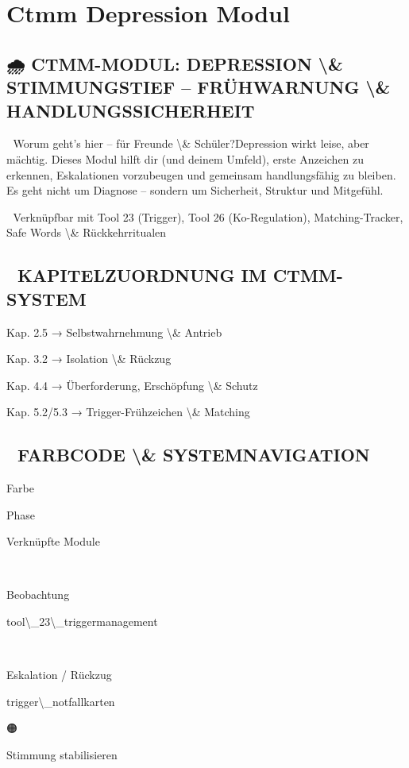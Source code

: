\section{Ctmm Depression Modul}

\subsection{🌧️ CTMM-MODUL: DEPRESSION \textbackslash{}& STIMMUNGSTIEF -- FRÜHWARNUNG \textbackslash{}& HANDLUNGSSICHERHEIT}

🧠 Worum geht’s hier -- für Freunde \textbackslash{}& Schüler?Depression wirkt leise, aber mächtig. Dieses Modul hilft dir (und deinem Umfeld), erste Anzeichen zu erkennen, Eskalationen vorzubeugen und gemeinsam handlungsfähig zu bleiben. Es geht nicht um Diagnose -- sondern um Sicherheit, Struktur und Mitgefühl.

🧩 Verknüpfbar mit Tool 23 (Trigger), Tool 26 (Ko-Regulation), Matching-Tracker, Safe Words \textbackslash{}& Rückkehrritualen

\subsection{📘 KAPITELZUORDNUNG IM CTMM-SYSTEM}

Kap. 2.5 → Selbstwahrnehmung \textbackslash{}& Antrieb

Kap. 3.2 → Isolation \textbackslash{}& Rückzug

Kap. 4.4 → Überforderung, Erschöpfung \textbackslash{}& Schutz

Kap. 5.2/5.3 → Trigger-Frühzeichen \textbackslash{}& Matching

\subsection{🎨 FARBCODE \textbackslash{}& SYSTEMNAVIGATION}

Farbe

Phase

Verknüpfte Module

🔵

Beobachtung

tool\textbackslash{}_23\textbackslash{}_triggermanagement

🔴

Eskalation / Rückzug

trigger\textbackslash{}_notfallkarten

🟠

Stimmung stabilisieren

